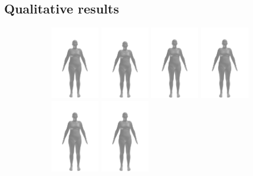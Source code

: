 \subsection{Qualitative results}
\begin{figure}[h]
	\centering
	\begin{subfigure}{\textwidth}
		\centering
		\includegraphics[width=60pt]{files/patients/9_2}
		\includegraphics[width=60pt]{files/patients/9_3}
		\includegraphics[width=60pt]{files/patients/9_4}
		\includegraphics[width=60pt]{files/patients/9_5}
		\includegraphics[width=60pt]{files/patients/9_6}
		\hspace{10pt}
		\includegraphics[width=60pt]{files/patients/9_predicted}

\end{subfigure}
\end{figure}
